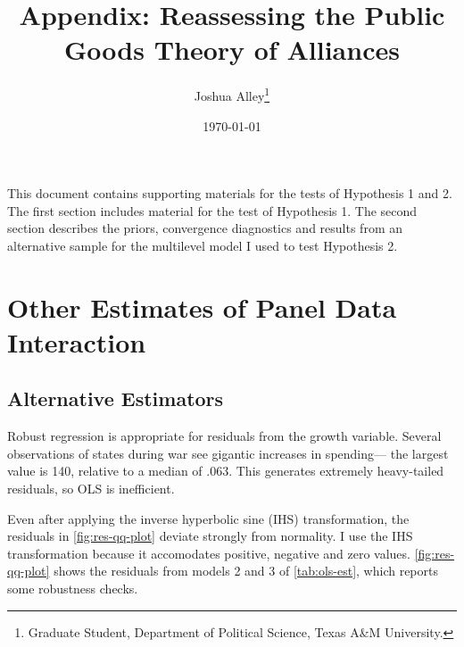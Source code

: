 \documentclass[12pt]{article}
\title{
\textbf{Appendix: Reassessing the Public Goods Theory of Alliances}
	}
\author{Joshua Alley\footnote{Graduate Student,
Department of Political Science, Texas A\&M University.}}
\date{{\normalsize \today}}
\begin{document}
\maketitle 

\doublespace

This document contains supporting materials for the tests of Hypothesis 1 and 2. 
The first section includes material for the test of Hypothesis 1. 
The second section describes the priors, convergence diagnostics and results from an alternative sample for the multilevel model I used to test Hypothesis 2. 

\section{Other Estimates of Panel Data Interaction}


\subsection{Alternative Estimators}


Robust regression is appropriate for residuals from the growth variable. 
Several observations of states during war see gigantic increases in spending--- the largest value is 140, relative to a median of .063. 
This generates extremely heavy-tailed residuals, so OLS is inefficient. 


Even after applying the inverse hyperbolic sine (IHS) transformation, the residuals in \autoref{fig:res-qq-plot} deviate strongly from normality. 
I use the IHS transformation because it accomodates positive, negative and zero values. 
\autoref{fig:res-qq-plot} shows the residuals from models 2 and 3 of \autoref{tab:ols-est}, which reports some robustness checks.
\end{document}
